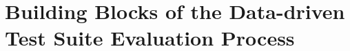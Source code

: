 \clearpage
\section{Building Blocks of the Data-driven Test Suite Evaluation Process}
\label{sec:limitationsData}









\clearpage